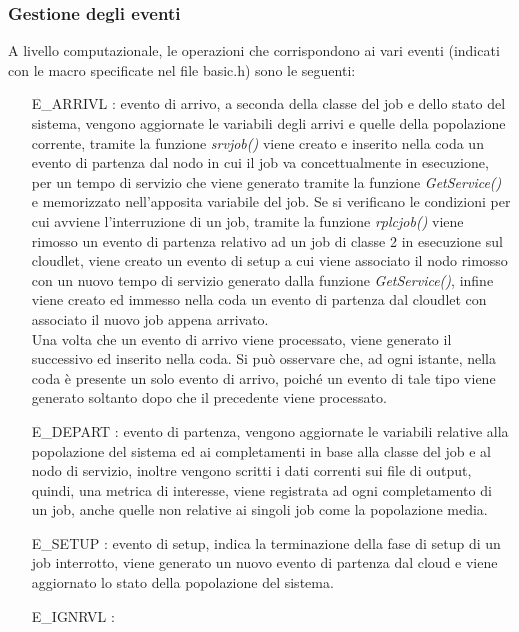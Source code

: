 \subsubsection{Gestione degli eventi}
A livello computazionale, le operazioni che corrispondono ai vari eventi
(indicati con le macro specificate nel file basic.h) sono le seguenti:
\begin{itemize}
\item[E\_ARRIVL]: evento di arrivo, a seconda della classe del job e dello stato
del sistema, vengono aggiornate le variabili degli arrivi e quelle della
popolazione corrente, tramite la funzione \emph{srvjob()} viene creato e
inserito nella coda un evento di partenza dal nodo in cui il job va
concettualmente in esecuzione, per un tempo di servizio che viene generato
tramite la funzione \emph{GetService()} e memorizzato nell’apposita variabile
del job. Se si verificano le condizioni per cui avviene l’interruzione di un
job, tramite la funzione \emph{rplcjob()} viene rimosso un evento di partenza
relativo ad un job di classe 2 in esecuzione sul cloudlet, viene creato un
evento di setup a cui viene associato il nodo rimosso con un nuovo tempo di
servizio generato dalla funzione \emph{GetService()}, infine viene creato ed
immesso nella coda un evento di partenza dal cloudlet con associato il nuovo job
appena arrivato.\\
Una volta che un evento di arrivo viene processato, viene generato il successivo
ed inserito nella coda. Si può osservare che, ad ogni istante, nella coda è
presente un solo evento di arrivo, poiché un evento di tale tipo viene generato
soltanto dopo che il precedente viene processato.

\item[E\_DEPART]: evento di partenza, vengono aggiornate le variabili relative
alla popolazione del sistema ed ai completamenti in base alla classe del job e
al nodo di servizio, inoltre vengono scritti i dati correnti sui file di output,
quindi, una metrica di interesse, viene registrata ad ogni completamento di un
job, anche quelle non relative ai singoli job come la popolazione media.

\item[E\_SETUP]: evento di setup, indica la terminazione della fase di setup di
un job interrotto, viene generato un nuovo evento di partenza dal cloud e viene
aggiornato lo stato della popolazione del sistema.

\item[E\_IGNRVL]:
\end{itemize}

